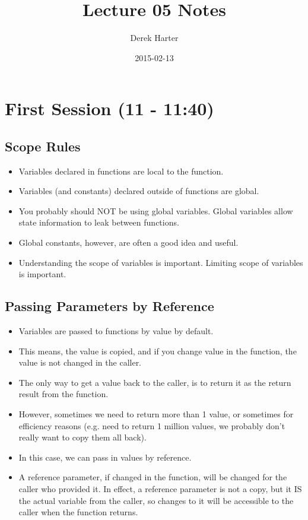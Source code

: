 \documentclass[11pt]{article}
\title{Lecture 05 Notes}
\author{Derek Harter}
\date{2015-02-13}
\begin{document}
\maketitle


\section{First Session (11 - 11:40)}
\label{sec-1}
\subsection{Scope Rules}
\label{sec-1-1}

\begin{itemize}
\item Variables declared in functions are local to the function.
\item Variables (and constants) declared outside of functions are global.
\item You probably should NOT be using global variables.  Global variables allow
  state information to leak between functions.
\item Global constants, however, are often a good idea and useful.
\item Understanding the scope of variables is important.  Limiting scope of
  variables is important.
\end{itemize}
\subsection{Passing Parameters by Reference}
\label{sec-1-2}

\begin{itemize}
\item Variables are passed to functions by value by default.
\item This means, the value is copied, and if you change value in the
  function, the value is not changed in the caller.
\item The only way to get a value back to the caller, is to return it
  as the return result from the function.
\item However, sometimes we need to return more than 1 value, or sometimes
  for efficiency reasons (e.g. need to return 1 million values, we probably
  don't really want to copy them all back).
\item In this case, we can pass in values by reference.
\item A reference parameter, if changed in the function, will be changed
  for the caller who provided it.  In effect, a reference parameter is
  not a copy, but it IS the actual variable from the caller, so
  changes to it will be accessible to the caller when the function
  returns.
\end{itemize}
\end{document}
